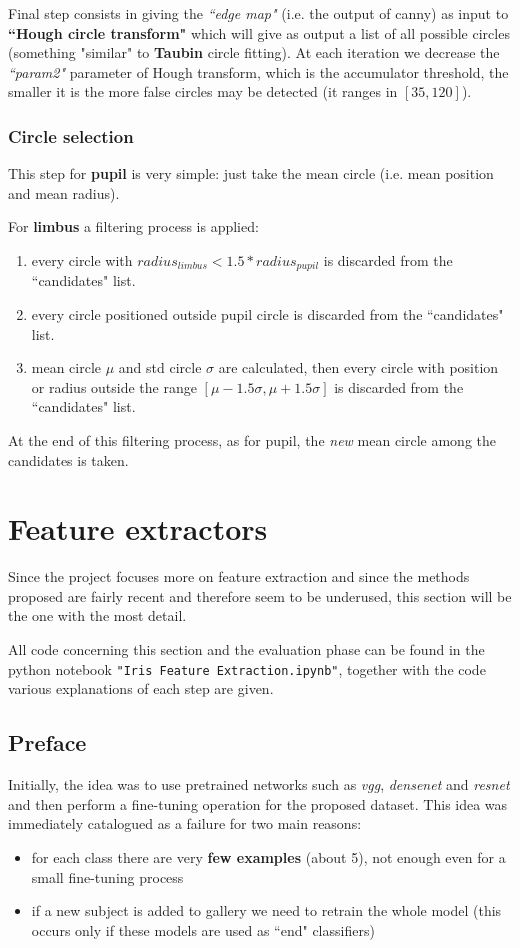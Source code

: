 \documentclass{article}
\begin{document}
\bigskip
Final step consists in giving the \textit{``edge map"} (i.e. the output of canny) as input to \textbf{``Hough circle transform"} which will give as output a list of all possible circles (something "similar" to \textbf{Taubin} circle fitting).
At each iteration we decrease the \textit{``param2"} parameter of Hough transform, which is the accumulator threshold, the smaller it is the more false circles may be detected (it ranges in $[35, 120]$).

\subsubsection{Circle selection}
This step for \textbf{pupil} is very simple: just take the mean circle (i.e. mean position and mean radius).

For \textbf{limbus} a filtering process is applied: 
\begin{enumerate}
    \item every circle with $radius_{limbus} < 1.5*radius_{pupil}$ is discarded from the ``candidates" list.
    \item every circle positioned outside pupil circle is discarded from the ``candidates" list. 
    \item mean circle $\mu$ and std circle $\sigma$ are calculated, then every circle with position or radius outside the range $[\mu - 1.5 \sigma, \mu + 1.5 \sigma]$ is discarded from the ``candidates" list. 
\end{enumerate}

At the end of this filtering process, as for pupil, the \textit{new} mean circle among the candidates is taken.

\section{Feature extractors}
Since the project focuses more on feature extraction and since the methods proposed are fairly recent and therefore seem to be underused, this section will be the one with the most detail.

\bigskip
All code concerning this section and the evaluation phase can be found in the python notebook \texttt{"Iris Feature Extraction.ipynb"}, together with the code various explanations of each step are given.

\subsection{Preface} 
Initially, the idea was to use pretrained networks such as \textit{vgg}, \textit{densenet} and \textit{resnet} and then perform a fine-tuning operation for the proposed dataset. This idea was immediately catalogued as a failure for two main reasons:
\begin{itemize}
    \item for each class there are very \textbf{few examples} (about 5), not enough even for a small fine-tuning process
    \item if a new subject is added to gallery we need to retrain the whole model (this occurs only if these models are used as ``end" classifiers)
\end{itemize}
\end{document}
